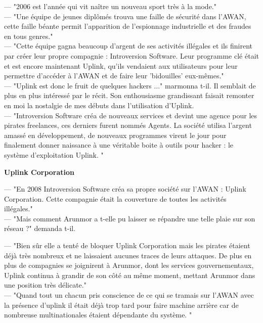 \documentclass[11pt,twoside,a4paper]{book}
\begin{document}
\begin{multicols*}{2}
 --- "2006 est l'ann{\'e}e qui vit na{\^i}tre un nouveau sport tr{\`e}s {\`a} la mode."~\\
 --- "Une {\'e}quipe de jeunes dipl{\^o}m{\'e}s trouva une faille de s{\'e}curit{\'e} dans l'AWAN, cette faille b{\'e}ante permit l'apparition de l'espionnage industrielle et des fraudes en tous genres."~\\
 --- "Cette {\'e}quipe gagna beaucoup d'argent de ses activit{\'e}s ill{\'e}gales et ils finirent par cr{\'e}er leur propre compagnie : Introversion Software. Leur programme cl{\'e} {\'e}tait et est encore maintenant Uplink, qu'ils vendaient aux utilisateurs pour leur permettre d'acc{\'e}der {\`a} l'AWAN et de faire leur 'bidouilles' eux-m{\^e}mes."~\\
 --- "Uplink est donc le fruit de quelques hackers ..." marmonna t-il. Il semblait de plus en plus int{\'e}ress{\'e} par le r{\'e}cit. Son enthousiasme grandissant faisait remonter en moi la nostalgie de mes d{\'e}buts dans l'utilisation d'Uplink.~\\
 --- "Introversion Software cr{\'e}a de nouveaux services et devint une agence pour les pirates freelances, ces derniers furent nomm{\'e}s Agents. La soci{\'e}t{\'e} utilisa l'argent amass{\'e} en d{\'e}veloppement, de nouveaux programmes virent le jour pour finalement donner naissance {\`a} une v{\'e}ritable boite {\`a} outils pour hacker : le syst{\`e}me d'exploitation Uplink. "~\\

\begin{center}
	\textbf{\Large Uplink Corporation}
\end{center}

 --- "En 2008 Introversion Software cr{\'e}a sa propre soci{\'e}t{\'e} sur l'AWAN : Uplink Corporation. Cette compagnie {\'e}tait la couverture de toutes les activit{\'e}s ill{\'e}gales."~\\
 --- "Mais comment Arunmor a t-elle pu laisser se r{\'e}pandre une telle plaie sur son r{\'e}seau ?" demanda t-il.~\\
 
 \vfill
 \columnbreak
 
 --- "Bien s{\^u}r elle a tent{\'e} de bloquer Uplink Corporation mais les pirates {\'e}taient d{\'e}j{\`a} tr{\`e}s nombreux et ne laissaient aucunes traces de leurs attaques. De plus en plus de compagnies se joignirent {\`a} Arunmor, dont les services gouvernementaux, Uplink continua {\`a} grandir de son c{\^o}t{\'e} au m{\^e}me moment, mettant Arunmor dans une position tr{\`e}s d{\'e}licate."~\\
 --- "Quand tout un chacun pris conscience de ce qui se tramais sur l'AWAN avec la pr{\'e}sence d'uplink il {\'e}tait d{\'e}j{\`a} trop tard pour faire machine arri{\`e}re car de nombreuse multinationales {\'e}taient d{\'e}pendante du syst{\`e}me. " ~\\


\end{multicols*}
\end{document}
